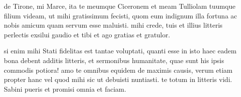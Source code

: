 


 de Tirone, mi Marce, ita te meumque Ciceronem et meam Tulliolam tuumque filium videam, ut mihi gratissimum fecisti, quom eum indignum illa fortuna ac nobis amicum quam servum esse maluisti. mihi crede, tuis et illius litteris perlectis exsilui gaudio et tibi et ago gratias et gratulor.

 si enim mihi Stati fidelitas est tantae voluptati, quanti esse in isto haec eadem bona debent additis litteris, et sermonibus humanitate, quae sunt his ipsis commodis potiora! amo te omnibus equidem de maximis causis, verum etiam propter hanc vel quod mihi sic ut debuisti nuntiasti. te totum in litteris vidi. Sabini pueris et promisi omnia et faciam.

